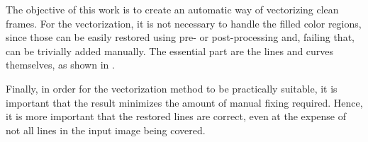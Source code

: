 The objective of this work is to create an automatic way of vectorizing clean frames. For the vectorization, it is not necessary to handle the filled color regions, since those can be easily restored using pre- or post-processing and, failing that, can be trivially added manually. The essential part are the lines and curves themselves, as shown in . %

Finally, in order for the vectorization method to be practically suitable, it is important that the result minimizes the amount of manual fixing required. Hence, it is more important that the restored lines are correct, even at the expense of not all lines in the input image being covered.
